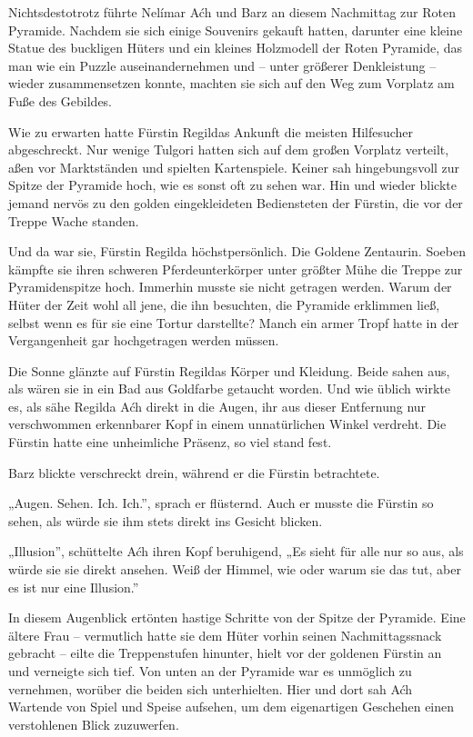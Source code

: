 Nichtsdestotrotz führte Nelímar Aćh und Barz an diesem Nachmittag zur Roten Pyramide. Nachdem sie sich einige Souvenirs gekauft hatten, darunter eine kleine Statue des buckligen Hüters und ein kleines Holzmodell der Roten Pyramide, das man wie ein Puzzle auseinandernehmen und – unter größerer Denkleistung – wieder zusammensetzen konnte, machten sie sich auf den Weg zum Vorplatz am Fuße des Gebildes.

Wie zu erwarten hatte Fürstin Regildas Ankunft die meisten Hilfesucher abgeschreckt. Nur wenige Tulgori hatten sich auf dem großen Vorplatz verteilt, aßen vor Marktständen und spielten Kartenspiele. Keiner sah hingebungsvoll zur Spitze der Pyramide hoch, wie es sonst oft zu sehen war. Hin und wieder blickte jemand nervös zu den golden eingekleideten Bediensteten der Fürstin, die vor der Treppe Wache standen.

Und da war sie, Fürstin Regilda höchstpersönlich. Die Goldene Zentaurin. Soeben kämpfte sie ihren schweren Pferdeunterkörper unter größter Mühe die Treppe zur Pyramidenspitze hoch. Immerhin musste sie nicht getragen werden. Warum der Hüter der Zeit wohl all jene, die ihn besuchten, die Pyramide erklimmen ließ, selbst wenn es für sie eine Tortur darstellte? Manch ein armer Tropf hatte in der Vergangenheit gar hochgetragen werden müssen.

Die Sonne glänzte auf Fürstin Regildas Körper und Kleidung. Beide sahen aus, als wären sie in ein Bad aus Goldfarbe getaucht worden. Und wie üblich wirkte es, als sähe Regilda Aćh direkt in die Augen, ihr aus dieser Entfernung nur verschwommen erkennbarer Kopf in einem unnatürlichen Winkel verdreht. Die Fürstin hatte eine unheimliche Präsenz, so viel stand fest.

Barz blickte verschreckt drein, während er die Fürstin betrachtete.

„Augen. Sehen. Ich. Ich.”, sprach er flüsternd. Auch er musste die Fürstin so sehen, als würde sie ihm stets direkt ins Gesicht blicken.

„Illusion”, schüttelte Aćh ihren Kopf beruhigend, „Es sieht für alle nur so aus, als würde sie sie direkt ansehen. Weiß der Himmel, wie oder warum sie das tut, aber es ist nur eine Illusion.”

In diesem Augenblick ertönten hastige Schritte von der Spitze der Pyramide. Eine ältere Frau – vermutlich hatte sie dem Hüter vorhin seinen Nachmittagssnack gebracht – eilte die Treppenstufen hinunter, hielt vor der goldenen Fürstin an und verneigte sich tief. Von unten an der Pyramide war es unmöglich zu vernehmen, worüber die beiden sich unterhielten. Hier und dort sah Aćh Wartende von Spiel und Speise aufsehen, um dem eigenartigen Geschehen einen verstohlenen Blick zuzuwerfen.

